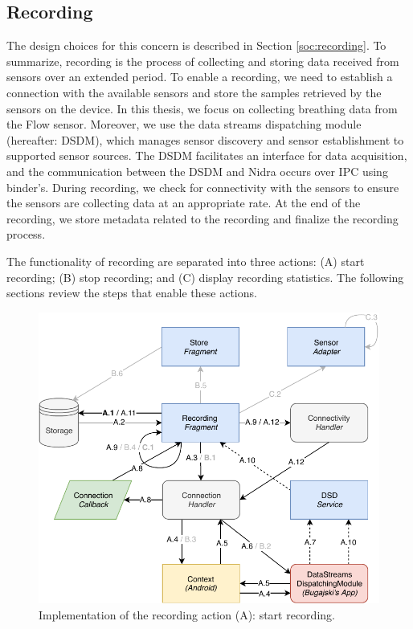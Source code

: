 \subsection{Recording}
The design choices for this concern is described in Section \ref{soc:recording}. To summarize, recording is the process of collecting and storing data received from sensors over an extended period. To enable a recording, we need to establish a connection with the available sensors and store the samples retrieved by the sensors on the device. In this thesis, we focus on collecting breathing data from the Flow sensor. Moreover, we use the data streams dispatching module (hereafter: DSDM), which manages sensor discovery and sensor establishment to supported sensor sources. The DSDM facilitates an interface for data acquisition, and the communication between the DSDM and Nidra occurs over IPC using binder's. During recording, we check for connectivity with the sensors to ensure the sensors are collecting data at an appropriate rate. At the end of the recording, we store metadata related to the recording and finalize the recording process. 

The functionality of recording are separated into three actions: (A) start recording; (B) stop recording; and (C) display recording statistics. The following sections review the steps that enable these actions. 

\begin{figure}[!h]
    \centering
    \includegraphics[scale=0.7]{images/Recording_ImpA.pdf}
    \caption{Implementation of the recording action (A): start recording.}
    \label{fig:impl_recordingA}
\end{figure}

